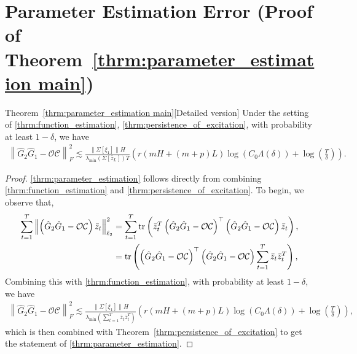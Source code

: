 \documentclass[11pt]{article}
\newcommand{\zbar}{\bar{z}}
\newcommand{\Ccal}{\mathcal{C}}
\newcommand{\Ocal}{\mathcal{O}}
\newcommand{\tn}[1]{\left\|{#1}\right\|_{\ell_2}}
\newcommand{\nn}{\nonumber}
\newcommand{\tf}[1]{\left\|{#1}\right\|_{F}}
\newcommand{\norm}[1]{\|{#1} \|}
\newcommand{\tr}{\textup{{tr}}} 			%
\newcommand{\T}{\top}
\newcommand{\<}{\langle}
\renewcommand{\>}{\rangle}
\numberwithin{equation}{section}
\begin{document}
\section{Parameter Estimation Error (Proof of Theorem~\ref{thrm:parameter_estimation main})}\label{app:parameter_estimation}
\begin{customtheorem}{Theorem~\ref{thrm:parameter_estimation main}}[Detailed version]\label{thrm:parameter_estimation}
	Under the setting of \ref{thrm:function_estimation}, \ref{thrm:persistence_of_excitation}, with probability at least $1-\delta$, we have
	\begin{align}
		\tf{\hat{G}_2\hat{G}_1 - \Ocal \Ccal }^2 \lesssim \frac{\norm{\Sigma[\xi_1]}H}{\lambda_{\min}\left( \Sigma[\zbar_L]\right) T}  \left( r \left(mH + (m+p)L \right)\log \left(C_0 \Lambda(\delta)\right) + \log \left(\frac{T}{\delta}\right) \right).
	\end{align}
\end{customtheorem}
\begin{proof}
	\ref{thrm:parameter_estimation} follows directly from combining \ref{thrm:function_estimation} and \ref{thrm:persistence_of_excitation}. To begin, we observe that,
	\begin{align}
		\sum_{t=1}^T\tn{\left(\hat{G}_2\hat{G}_1 - \Ocal \Ccal\right) \zbar_t}^2 &= \sum_{t=1}^T\tr\left(\zbar_t^T\left(\hat{G}_2\hat{G}_1 - \Ocal \Ccal\right)^\T \left(\hat{G}_2\hat{G}_1 - \Ocal \Ccal\right) \zbar_t\right),\nn \\
		&= \tr\left(\left(\hat{G}_2\hat{G}_1 - \Ocal \Ccal\right)^\T \left(\hat{G}_2\hat{G}_1 - \Ocal \Ccal\right) \sum_{t=1}^T \zbar_t \zbar_t^T\right),
	\end{align}
	Combining this with \ref{thrm:function_estimation}, with probability at least $1-\delta$, we have
	\begin{align}
		\tf{\hat{G}_2\hat{G}_1 - \Ocal \Ccal }^2 \lesssim \frac{\norm{\Sigma[\xi_1]}H}{\lambda_{\min}\left(  \sum_{t=1}^T \zbar_t \zbar_t^T\right)}  \left( r \left(mH + (m+p)L \right)\log \left(C_0 \Lambda(\delta)\right) + \log \left(\frac{T}{\delta}\right) \right),
	\end{align}
	which is then combined with Theorem~\ref{thrm:persistence_of_excitation} to get the statement of \ref{thrm:parameter_estimation}.
\end{proof}
\end{document}
